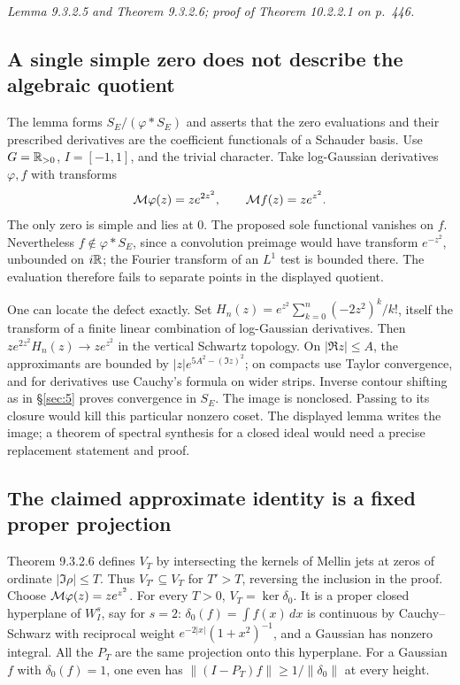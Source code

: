 \documentclass[11pt,reqno]{amsart}
\numberwithin{equation}{section}
\begin{document}
\textit{Lemma 9.3.2.5 and Theorem 9.3.2.6; proof of Theorem 10.2.2.1 on p.~446.}\par
\subsection*{A single simple zero does not describe the algebraic quotient}
The lemma forms \(S_E/(\varphi*S_E)\) and asserts that the zero evaluations and their prescribed derivatives are the coefficient functionals of a Schauder basis. Use \(G=\mathbb R_{>0}\), \(I=[-1,1]\), and the trivial character. Take log-Gaussian derivatives \(\varphi,f\) with transforms
\[
       \mathcal M\varphi(z)=z e^{2z^2},\qquad \mathcal M f(z)=z e^{z^2}.
\]
The only zero is simple and lies at 0. The proposed sole functional vanishes on \(f\). Nevertheless \(f\notin \varphi*S_E\), since a convolution preimage would have transform \(e^{-z^2}\), unbounded on \(i\mathbb R\); the Fourier transform of an \(L^1\) test is bounded there. The evaluation therefore fails to separate points in the displayed quotient.

One can locate the defect exactly. Set \(H_n(z)=e^{z^2}\sum_{k=0}^n(-2z^2)^k/k!\), itself the transform of a finite linear combination of log-Gaussian derivatives. Then \(z e^{2z^2}H_n(z)\to z e^{z^2}\) in the vertical Schwartz topology. On \(|\Re z|\le A\), the approximants are bounded by \(|z|e^{5A^2-(\Im z)^2}\); on compacts use Taylor convergence, and for derivatives use Cauchy's formula on wider strips. Inverse contour shifting as in \S\ref{sec:5} proves convergence in \(S_E\). The image is nonclosed. Passing to its closure would kill this particular nonzero coset. The displayed lemma writes the image; a theorem of spectral synthesis for a closed ideal would need a precise replacement statement and proof.

\subsection*{The claimed approximate identity is a fixed proper projection}
Theorem 9.3.2.6 defines \(V_T\) by intersecting the kernels of Mellin jets at zeros of ordinate \(|\Im\rho|\le T\). Thus \(V_{T'}\subseteq V_T\) for \(T'>T\), reversing the inclusion in the proof. Choose \(\mathcal M\varphi(z)=ze^{z^2}\). For every \(T>0\), \(V_T=\ker\delta_0\). It is a proper closed hyperplane of \(W_I^s\), say for \(s=2\): \(\delta_0(f)=\int f(x)\,dx\) is continuous by Cauchy--Schwarz with reciprocal weight \(e^{-2|x|}(1+x^2)^{-1}\), and a Gaussian has nonzero integral. All the \(P_T\) are the same projection onto this hyperplane. For a Gaussian \(f\) with \(\delta_0(f)=1\), one even has \(\|(I-P_T)f\|\ge1/\|\delta_0\|\) at every height.
\end{document}

